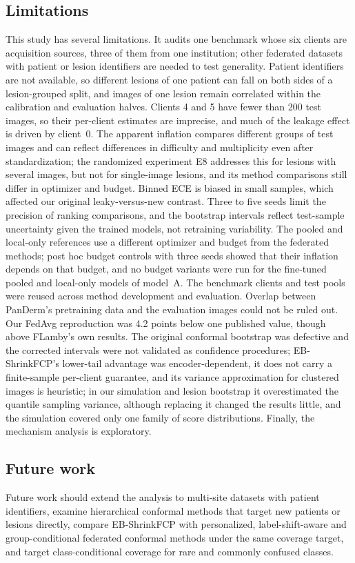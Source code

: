 \subsection{Limitations}

This study has several limitations. It audits one benchmark whose six clients are acquisition sources,
three of them from one institution; other federated datasets with patient or lesion identifiers are needed
to test generality. Patient identifiers are not available, so different lesions of one patient can fall on
both sides of a lesion-grouped split, and images of one lesion remain correlated within the calibration and
evaluation halves. Clients 4 and 5 have fewer than 200 test images, so their per-client estimates are
imprecise, and much of the leakage effect is driven by client~0. The apparent inflation compares different
groups of test images and can reflect differences in difficulty and multiplicity even after
standardization; the randomized experiment E8 addresses this for lesions with several images, but not for single-image lesions, and its method comparisons still differ in optimizer and budget. Binned ECE is biased in small samples, which affected our original leaky-versus-new
contrast. Three to five seeds limit the precision of ranking comparisons, and the bootstrap intervals
reflect test-sample uncertainty given the trained models, not retraining variability. The pooled and
local-only references use a different optimizer and budget from the federated methods; post hoc budget
controls with three seeds showed that their inflation depends on that budget, and no budget variants were
run for the fine-tuned pooled and local-only models of model~A. The benchmark clients and test pools were reused
across method development and evaluation. Overlap between PanDerm's pretraining data and the evaluation
images could not be ruled out. Our FedAvg reproduction was 4.2 points below one published value, though
above FLamby's own results. The original conformal bootstrap was defective and the corrected intervals were not validated as confidence procedures; EB-ShrinkFCP's lower-tail advantage was encoder-dependent, it does not carry a
finite-sample per-client guarantee, and its variance approximation for clustered images is heuristic; in
our simulation and lesion bootstrap it overestimated the quantile sampling variance, although replacing it changed the results little, and the simulation covered only one family of score distributions.
Finally, the mechanism analysis is exploratory.

\subsection{Future work}

Future work should extend the analysis to multi-site datasets with patient identifiers, examine
hierarchical conformal methods that target new patients or lesions directly, compare EB-ShrinkFCP with
personalized, label-shift-aware and group-conditional federated conformal methods
\cite{min2025pfcp,plassier2023labelshift,wen2026gcfcp} under the same coverage target, and target
class-conditional coverage for rare and commonly confused classes.
